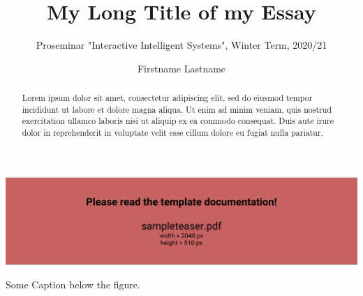 \documentclass[sigchi]{acmart}
\makeatletter
\newcommand{\myLongTitle}{My Long Title of my Essay} %
\newcommand{\myShortTitle}{Short Title of Essay} %
\makeatother
\begin{document}
\title{\myLongTitle{}}

\subtitle{Proseminar "Interactive Intelligent Systems", Winter Term, 2020/21}

\author{Firstname Lastname} %

\renewcommand{\shortauthors}{F. Lastname - \myShortTitle{}} %


\begin{abstract}
  Lorem ipsum dolor sit amet, consectetur adipiscing elit, sed do eiusmod tempor incididunt ut labore et dolore magna aliqua. Ut enim ad minim veniam, quis nostrud exercitation ullamco laboris nisi ut aliquip ex ea commodo consequat. Duis aute irure dolor in reprehenderit in voluptate velit esse cillum dolore eu fugiat nulla pariatur.
\end{abstract}


\begin{teaserfigure}
  \includegraphics[width=\textwidth]{sampleteaser}
  \caption{Some Caption below the figure.}
  \label{fig:teaser}
\end{teaserfigure}
\end{document}
